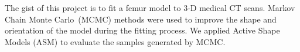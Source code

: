 The gist of this project is to fit a femur model to 3-D medical CT scans.
Markov Chain Monte Carlo~(MCMC) methods were used to improve the shape and orientation of the model during the fitting process.
We applied Active Shape Models (ASM) to evaluate the samples generated by MCMC.
